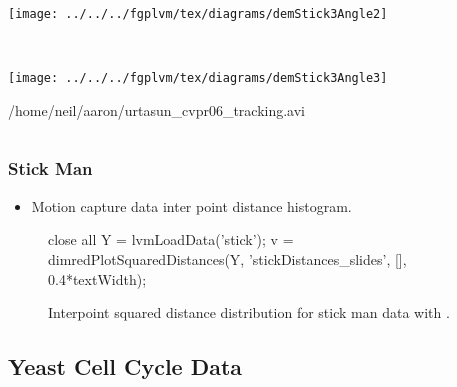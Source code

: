 \begin{frame}
\begin{columns}
\begin{center}
{\begin{minipage}[b][0.8\textheight][t]{0.5\columnwidth}
          \begin{minipage}[t][0.3\textheight]{1\columnwidth}%
            \begin{center}
              \texttt{[image: ../../../fgplvm/tex/diagrams/demStick3Angle2]}
            \end{center}%
          \end{minipage}\\
          \begin{minipage}[t][0.3\textheight]{1\columnwidth}%
            \begin{center}
              \texttt{[image: ../../../fgplvm/tex/diagrams/demStick3Angle3]}
            \end{center}%
          \end{minipage}%
        \end{minipage}}{/home/neil/aaron/urtasun_cvpr06_tracking.avi}
    \end{center}
    
  \end{columns}

\end{frame}

\begin{frame}[fragile]
  \frametitle{Stick Man}
  \begin{itemize}
  \item Motion capture data inter point distance histogram.
  \end{itemize}
  \begin{figure}
    \begin{matlab}
    close all
    Y = lvmLoadData('stick');
    v = dimredPlotSquaredDistances(Y, 'stickDistances_slides', [], 0.4*textWidth);
    \end{matlab}

    \begin{center}
    \end{center}
    
  
    \caption{Interpoint squared distance distribution for stick man data
    with \captionInfo.}\label{fig:stickManDistances}

  \end{figure}

\end{frame}

\subsection{Yeast Cell Cycle Data}

